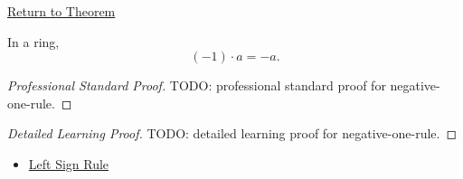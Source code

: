 \newpage
{}
\label{prf:negative-one-rule}

\begin{remark*}[Return]
\hyperref[cor:negative-one-rule]{Return to Theorem}
\end{remark*}

\begin{corollary*}
In a ring,
\[
(-1)\cdot a=-a.
\]
\end{corollary*}

\begin{proof}[Professional Standard Proof]
\LRAProofBodyStart
TODO: professional standard proof for negative-one-rule.
\end{proof}

\begin{proof}[Detailed Learning Proof]
\LRAProofBodyStart
TODO: detailed learning proof for negative-one-rule.
\end{proof}

\begin{remark*}
\end{remark*}

\begin{dependencies}
\begin{itemize}
  \item \hyperref[prop:left-sign-rule]{Left Sign Rule}
\end{itemize}
\end{dependencies}

\clearpage
